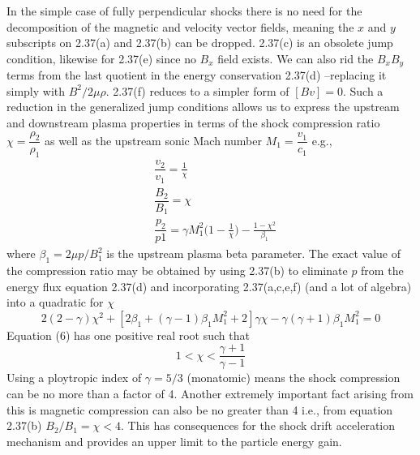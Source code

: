 In the simple case of fully perpendicular shocks there is no need for the decomposition of the magnetic and velocity vector fields, meaning the $x$ and $y$ subscripts on 2.37(a) and 2.37(b) can be dropped. 2.37(c) is an obsolete jump condition, likewise for 2.37(e) since no $B_x$ field exists. We can also rid the $B_{x}B_{y}$ terms from the last quotient in the energy conservation 2.37(d) --replacing it simply with $B^{2}/2\mu\rho$. 2.37(f) reduces to a simpler form of $[Bv]=0$. Such a reduction in the generalized jump conditions allows us to express the upstream and downstream plasma properties in terms of the shock compression ratio $\chi=\dfrac{\rho_{2}}{\rho_{1}}$ as well as the upstream sonic Mach number $M_{1}=\dfrac{v_{1}}{c_{1}}$ \citep{priest2000} e.g.,
\begin{subequations}
\begin{align}
&\dfrac{v_{2}}{v_{1}}=\frac{1}{\chi} \\
&\dfrac{B_{2}}{B_{1}}=\chi \\
&\dfrac{p_{2}}{p{1}}=\gamma M_{1}^2\bigg(1-\frac{1}{\chi}\bigg) - \frac{1-\chi^2}{\beta_{1}}
\end{align}
\end{subequations}
where $\beta_{1}=2\mu p/B_{1}^2$ is the upstream plasma beta parameter. The exact value of the compression ratio may be obtained by using 2.37(b) to eliminate $p$ from the energy flux equation 2.37(d) and incorporating 2.37(a,c,e,f) (and a lot of algebra) into a quadratic for $\chi$
\begin{equation}
2(2-\gamma)\chi^{2}+[2\beta_{1}+(\gamma-1)\beta_{1}M_{1}^2+2]\gamma\chi - \gamma(\gamma+1)\beta_{1}M_{1}^2=0
\end{equation}
Equation (6) has one positive real root such that 
\begin{equation}
1< \chi < \frac{\gamma+1}{\gamma-1}
\label{eqn:compression}
\end{equation}
Using a ploytropic index of $\gamma=5/3$ (monatomic) means the shock compression can be no more than a factor of 4. Another extremely important fact arising from this is magnetic compression can also be no greater than 4 i.e., from equation 2.37(b) $B_{2}/B_{1}=\chi<4$. This has consequences for the shock drift acceleration mechanism and provides an upper limit to the particle energy gain.


